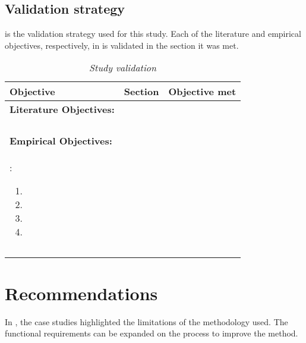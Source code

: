 \subsection{Validation strategy}
 is the validation strategy used for this study. Each of the literature and empirical objectives, respectively, in  is validated in the section it was met.

\clearpage

\begin{table}[!htb]
	\centering
	\caption[Study validation]
	{\textit{Study validation}}
	\label{tbl:ch4_ValidationStart}
	\begin{tabularx}{\textwidth}{Xp{3cm}p{3cm}}
		\toprule
		\textbf{Objective}  & \textbf{Section} & \textbf{Objective met} \\ \midrule
		\textbf{Literature Objectives:} & & \\ \midrule
		\rowcolor{lightgray}
		\RaggedRight \objAi & \RaggedRight \Cref{sec:ch2_logAttributesRequirements,sec:ch2_webApplicationArchitecture} & \cmark \\
		\RaggedRight \objAii & \RaggedRight \Cref{sec:ch2_loggingPoints,sec:ch2_webApplicationArchitecture} & \cmark \\
		\rowcolor{lightgray}
		\RaggedRight \objAiii & \Cref{sec:ch2_logAnalysisTools} & \cmark \\ 
		\RaggedRight \objAiv & \Cref{sec:ch2_utilisationImprovements} & \cmark \\ \midrule
		\textbf{Empirical Objectives:} & & \\ \midrule
		\rowcolor{lightgray}
		\RaggedRight \objBi: 
			\begin{enumerate}
				\item \objBiSubA
				\item \objBiSubB
				\item \objBiSubD
				\item \objBiSubC
			\end{enumerate} & \Cref{sec:ch3_implementation} & \cmark \\
		\RaggedRight \objBii & \Cref{sec:ch3_Verification} & \cmark \\
		\rowcolor{lightgray}
		\RaggedRight \objBiii & \Cref{sec:ch3_caseStudies} & \cmark \\
		\bottomrule
	\end{tabularx}
\end{table}


\section{Recommendations}
In , the case studies highlighted the limitations of the methodology used. The functional requirements can be expanded on the process to improve the method.

